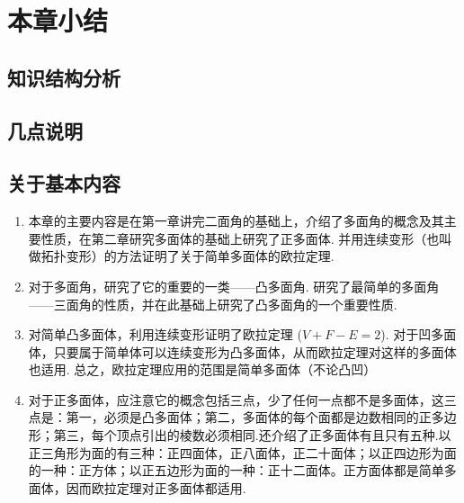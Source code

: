 \section{本章小结}

\subsection{知识结构分析}



\begin{center}
\end{center}

\subsection{几点说明}

\subsection*{关于基本内容}
\begin{enumerate}[(1)]
    \item 本章的主要内容是在第一章讲完二面角的基础上，介绍了多面角的概念及其主要性质，在第二章研究多面体的基础上研究了正多面体. 并用连续变形（也叫做拓扑变形）的方法证明了关于简单多面体的欧拉定理.

    \item 对于多面角，研究了它的重要的一类——凸多面角. 研究了最简单的多面角——三面角的性质，并在此基础上研究了凸多面角的一个重要性质.

    \item 对简单凸多面体，利用连续变形证明了欧拉定理 ($V+F-E=2$). 对于凹多面体，只要属于简单体可以连续变形为凸多面体，从而欧拉定理对这样的多面体也适用. 总之，欧拉定理应用的范围是简单多面体（不论凸凹）
    \item 对于正多面体，应注意它的概念包括三点，少了任何一点都不是多面体，这三点是：第一，必须是凸多面体；第二，多面体的每个面都是边数相同的正多边形；第三，每个顶点引出的棱数必须相同.还介绍了正多面体有且只有五种.以正三角形为面的有三种：正四面体，正八面体，正二十面体；以正四边形为面的一种：正方体；以正五边形为面的一种：正十二面体。正方面体都是简单多面体，因而欧拉定理对正多面体都适用.
\end{enumerate}



